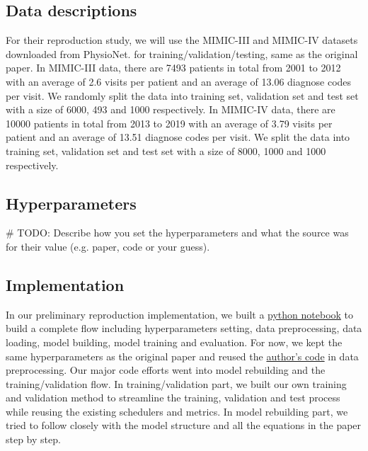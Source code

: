 \documentclass[11pt,a4paper,fleqn]{article}
\begin{document}
\subsection{Data descriptions}
For their reproduction study, we will use the MIMIC-III \cite{mimic3} and MIMIC-IV
\cite{mimic4} datasets downloaded from PhysioNet\cite{physionet}. for training/validation/testing, same as the original paper. In MIMIC-III data, there are 7493 patients in total from 2001 to 2012 with an average of 2.6 visits per patient and an average of 13.06 diagnose codes per visit. We randomly split the data into training set, validation set and test set with a size of 6000, 493 and 1000 respectively. In MIMIC-IV data, there are 10000 patients in total from 2013 to 2019 with an average of 3.79 visits per patient and an average of 13.51 diagnose codes per visit. We split the data into training set, validation set and test set with a size of 8000, 1000 and 1000 respectively. 

\subsection{Hyperparameters}
\# TODO:
Describe how you set the hyperparameters and what the source was for their value (e.g. paper, code or your guess). 

\subsection{Implementation}
In our preliminary reproduction implementation, we built a \href{https://github.com/willtsai/dlh-sp23-team53/blob/main/notebook.ipynb}{python notebook} to build a complete flow including hyperparameters setting, 
data preprocessing, data loading, model building, model training and evaluation. For now, we kept the same hyperparameters as the original paper and reused the \href{https://github.com/LuChang-CS/Chet}{author's code} in data preprocessing.
Our major code efforts went into model rebuilding and the training/validation flow. In training/validation part, we built our own training and validation method to streamline the training, validation and test process while reusing the existing 
schedulers and metrics. In model rebuilding part, we tried to follow closely with the model structure and all the equations in the paper step by step.
\end{document}
